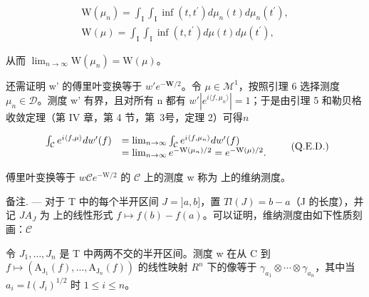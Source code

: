 \[
\begin{array}{r} \mathrm{W} (\mu_ {n}) = \int_ {\mathrm{I}} \int_ {\mathrm{I}} \inf (t, t ^ {\prime}) d \mu_ {n} (t) d \mu_ {n} (t ^ {\prime}), \\ \mathrm{W} (\mu) = \int_ {\mathrm{I}} \int_ {\mathrm{I}} \inf (t, t ^ {\prime}) d \mu (t) d \mu (t ^ {\prime}), \end{array}
\]

从而 \(\lim_{n\to \infty}\mathrm{W}(\mu_n) = \mathrm{W}(\mu)\)。

还需证明 w' 的傅里叶变换等于 \(w'\)\(e^{-\mathbf{W}/2}\)。令 \(\mu \in \mathcal{M}^1\)，按照引理 6 选择测度 \(\mu_n \in \mathcal{D}\)。测度 w' 有界，且对所有 n 都有 \(w'\)\(|e^{i\langle f,\mu_n\rangle}| = 1\)；于是由引理 5 和勒贝格收敛定理（第 IV 章，第 4 节，第~3号，定理 2）可得\(n\)

\[
\begin{array}{r l} \int_ {\mathcal {C}} e ^ {i \langle f, \mu \rangle} d w ^ {\prime} (f) & = \lim _ {n \to \infty} \int_ {\mathcal {C}} e ^ {i \langle f, \mu_ {n} \rangle} d w ^ {\prime} (f) \\ & = \lim _ {n \to \infty} e ^ {- \mathrm{W} (\mu_ {n}) / 2} = e ^ {- \mathrm{W} (\mu) / 2}. \end{array}\tag{Q.E.D.}
\]

傅里叶变换等于 \(w\)\(\mathcal{C}\)\(e^{-\mathrm{W} / 2}\) 的 \(\mathcal{C}\) 上的测度 w 称为  上的维纳测度。

备注. --- 对于 T 中的每个半开区间 \(J = ]a, b]\)，置 \(T\)\(l(J) = b - a\)（J 的长度），并记 \(J\)\(A_J\) 为  上的线性形式 \(f \mapsto f(b) - f(a)\)。可以证明，维纳测度由如下性质刻画：\(\mathcal{C}\)

令 \(J_{1},\ldots,J_{n}\) 是 T 中两两不交的半开区间。测度 w 在从 C 到 \(f\mapsto\left(\mathrm{A}_{\mathrm{J}_{1}}(f),\ldots,\mathrm{A}_{\mathrm{J}_{n}}(f)\right)\) 的线性映射 \(R^{n}\) 下的像等于 \(\gamma_{a_{1}}\otimes\cdots\otimes\gamma_{a_{n}}\)，其中当 \(a_{i}=l(J_{i})^{1/2}\) 时 \(1\leqslant i\leqslant n\)。

